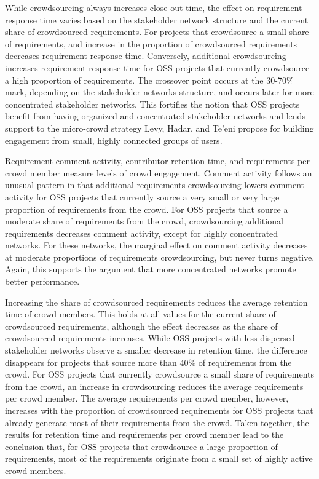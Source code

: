 While crowdsourcing always increases close-out time, the effect on requirement response time varies based on the stakeholder network structure and the current share of crowdsourced requirements. For projects that crowdsource a small share of requirements, and increase in the proportion of crowdsourced requirements decreases requirement response time. Conversely, additional crowdsourcing increases requirement response time for OSS projects that currently crowdsource a high proportion of requirements. The crossover point occurs at the 30-70\% mark, depending on the stakeholder networks structure, and occurs later for more concentrated stakeholder networks. This fortifies the notion that OSS projects benefit from having organized and concentrated stakeholder networks and lends support to the micro-crowd strategy Levy, Hadar, and Te'eni \cite{levy} propose for building engagement from small, highly connected groups of users.

Requirement comment activity, contributor retention time, and requirements per crowd member measure levels of crowd engagement. Comment activity follows an unusual pattern in that additional requirements crowdsourcing lowers comment activity for OSS projects that currently source a very small or very large proportion of requirements from the crowd. For OSS projects that source a moderate share of requirements from the crowd, crowdsourcing additional requirements decreases comment activity, except for highly concentrated networks. For these networks, the marginal effect on comment activity decreases at moderate proportions of requirements crowdsourcing, but never turns negative. Again, this supports the argument that more concentrated networks promote better performance.

Increasing the share of crowdsourced requirements reduces the average retention time of crowd members. This holds at all values for the current share of crowdsourced requirements, although the effect decreases as the share of crowdsourced requirements increases. While OSS projects with less dispersed stakeholder networks observe a smaller decrease in retention time, the difference disappears for projects that source more than 40\% of requirements from the crowd. For OSS projects that currently crowdsource a small share of requirements from the crowd, an increase in crowdsourcing reduces the average requirements per crowd member. The average requirements per crowd member, however, increases with the proportion of crowdsourced requirements for OSS projects that already generate most of their requirements from the crowd. Taken together, the results for retention time and requirements per crowd member lead to the conclusion that, for OSS projects that crowdsource a large proportion of requirements, most of the requirements originate from a small set of highly active crowd members. 

